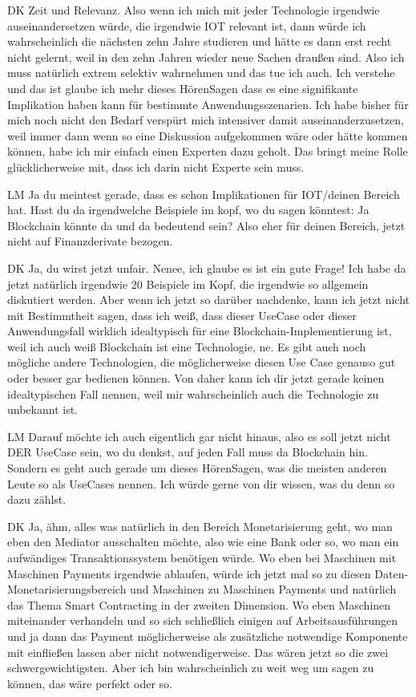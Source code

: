 \begin{xlist}
     \item[DK] Zeit und Relevanz. Also wenn ich mich mit jeder Technologie irgendwie auseinandersetzen würde, die irgendwie IOT relevant ist, dann würde ich wahrscheinlich die nächsten zehn Jahre studieren und hätte es dann erst recht nicht gelernt, weil in den zehn Jahren wieder neue Sachen draußen sind. Also ich muss natürlich extrem selektiv wahrnehmen und das tue ich auch. Ich verstehe und das ist glaube ich mehr dieses HörenSagen dass es eine signifikante Implikation haben kann für bestimmte Anwendungsszenarien. Ich habe bisher für mich noch nicht den Bedarf verspürt mich intensiver damit auseinanderzusetzen, weil immer dann wenn so eine Diskussion aufgekommen wäre oder hätte kommen können, habe ich mir einfach einen Experten dazu geholt. Das bringt meine Rolle glücklicherweise mit, dass ich darin nicht Experte sein muss.
     \item[LM] Ja du meintest gerade, dass es schon Implikationen für IOT/deinen Bereich hat. Hast du da irgendwelche Beispiele im kopf, wo du sagen könntest: Ja Blockchain könnte da und da bedeutend sein? Also eher für deinen Bereich, jetzt nicht auf Finanzderivate bezogen.
     \item[DK] Ja, du wirst jetzt unfair. Nenee, ich glaube es ist ein gute Frage! Ich habe da jetzt natürlich irgendwie 20 Beispiele im Kopf, die irgendwie so allgemein diskutiert werden. Aber wenn ich jetzt so darüber nachdenke, kann ich jetzt nicht mit Bestimmtheit sagen, dass ich weiß, dass dieser UseCase oder dieser Anwendungsfall wirklich idealtypisch für eine Blockchain-Implementierung ist, weil ich auch weiß Blockchain ist eine Technologie, ne. Es gibt auch noch mögliche andere Technologien, die möglicherweise diesen Use Case genauso gut oder besser gar bedienen können. Von daher kann ich dir jetzt gerade keinen idealtypischen Fall nennen, weil mir wahrscheinlich auch die Technologie zu unbekannt ist.
     \item[LM] Darauf möchte ich auch eigentlich gar nicht hinaus, also es soll jetzt nicht DER UseCase sein, wo du denkst, auf jeden Fall muss da Blockchain hin. Sondern es geht auch gerade um dieses HörenSagen, was die meisten anderen Leute so als UseCases nennen. Ich würde gerne von dir wissen, was du denn so dazu zählst.
     \item[DK] Ja, ähm, alles was natürlich in den Bereich Monetarisierung geht, wo man eben den Mediator ausschalten möchte, also wie eine Bank oder so, wo man ein aufwändiges Transaktionssystem  benötigen würde. Wo eben bei Maschinen mit Maschinen Payments irgendwie ablaufen, würde ich jetzt mal so zu diesen Daten-Monetarisierungsbereich und Maschinen zu Maschinen Payments und natürlich das Thema Smart Contracting in der zweiten Dimension. Wo eben Maschinen miteinander verhandeln und so sich schließlich einigen auf Arbeitsausführungen und ja dann das Payment möglicherweise als zusätzliche notwendige Komponente mit einfließen lassen aber nicht notwendigerweise. Das wären jetzt so die zwei schwergewichtigsten. Aber ich bin wahrscheinlich zu weit weg um sagen zu können, das wäre perfekt oder so.

\end{xlist}
